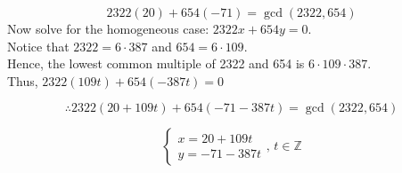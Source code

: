 \documentclass[a4paper]{article}
\begin{document}
\[2322(20)+654(-71)=\gcd(2322,654)\]
Now solve for the homogeneous case: \(2322x+654y=0\).\\
Notice that \(2322=6\cdot387\) and \(654=6\cdot109\).\\
Hence, the lowest common multiple of 2322 and 654 is \(6\cdot109\cdot387\).\\
Thus, \(2322(109t)+654(-387t)=0\)

\[\therefore2322(20+109t)+654(-71-387t)=\gcd(2322,654)\]

\[\begin{cases}
    x=\boxed{20+109t}\\
    y=\boxed{-71-387t}
\end{cases}
,\,t\in\mathbb Z\]
\end{document}
